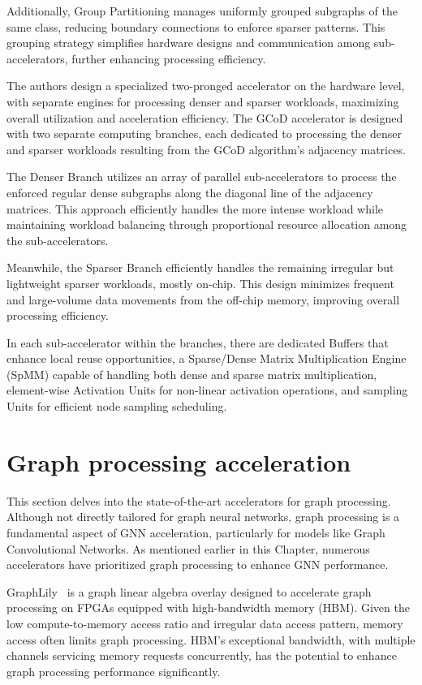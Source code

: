 Additionally, Group Partitioning manages uniformly grouped subgraphs of the same class, reducing boundary connections to enforce sparser patterns.
This grouping strategy simplifies hardware designs and communication among sub-accelerators, further enhancing processing efficiency.

The authors design a specialized two-pronged accelerator on the hardware level, with separate engines for processing denser and sparser workloads, maximizing overall utilization and acceleration efficiency.
The GCoD accelerator is designed with two separate computing branches, each dedicated to processing the denser and sparser workloads resulting from the GCoD algorithm's adjacency matrices.

The Denser Branch utilizes an array of parallel sub-accelerators to process the enforced regular dense subgraphs along the diagonal line of the adjacency matrices.
This approach efficiently handles the more intense workload while maintaining workload balancing through proportional resource allocation among the sub-accelerators.

Meanwhile, the Sparser Branch efficiently handles the remaining irregular but lightweight sparser workloads, mostly on-chip.
This design minimizes frequent and large-volume data movements from the off-chip memory, improving overall processing efficiency.

In each sub-accelerator within the branches, there are dedicated Buffers that enhance local reuse opportunities,
a Sparse/Dense Matrix Multiplication Engine (SpMM) capable of handling both dense and sparse matrix multiplication,
element-wise Activation Units for non-linear activation operations, and sampling Units for efficient node sampling scheduling.

\section{Graph processing acceleration}
\label{sec:hbm-equipped-fpga-accelerators}%

This section delves into the state-of-the-art accelerators for graph processing.
Although not directly tailored for graph neural networks, graph processing is a fundamental aspect of GNN acceleration, particularly for models like Graph Convolutional Networks.
As mentioned earlier in this Chapter, numerous accelerators have prioritized graph processing to enhance GNN performance.

GraphLily~\cite{9643582} is a graph linear algebra overlay designed to accelerate graph processing on FPGAs equipped with high-bandwidth memory (HBM).
Given the low compute-to-memory access ratio and irregular data access pattern, memory access often limits graph processing.
HBM's exceptional bandwidth, with multiple channels servicing memory requests concurrently, has the potential to enhance graph processing performance significantly.


